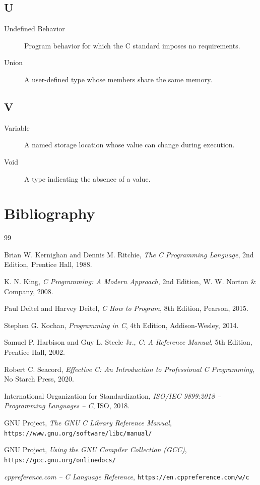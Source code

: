 \documentclass[12pt,openany]{book}
\begin{document}
\section*{U}

\begin{description}
    \item[Undefined Behavior] Program behavior for which the C standard imposes no requirements.
    \item[Union] A user-defined type whose members share the same memory.
\end{description}

\section*{V}

\begin{description}
    \item[Variable] A named storage location whose value can change during execution.
    \item[Void] A type indicating the absence of a value.
\end{description}
\chapter{Bibliography}

\begin{thebibliography}{99}

Brian W. Kernighan and Dennis M. Ritchie,
\textit{The C Programming Language},
2nd Edition,
Prentice Hall, 1988.

K. N. King,
\textit{C Programming: A Modern Approach},
2nd Edition,
W. W. Norton \& Company, 2008.

Paul Deitel and Harvey Deitel,
\textit{C How to Program},
8th Edition,
Pearson, 2015.

Stephen G. Kochan,
\textit{Programming in C},
4th Edition,
Addison-Wesley, 2014.

Samuel P. Harbison and Guy L. Steele Jr.,
\textit{C: A Reference Manual},
5th Edition,
Prentice Hall, 2002.

Robert C. Seacord,
\textit{Effective C: An Introduction to Professional C Programming},
No Starch Press, 2020.

International Organization for Standardization,
\textit{ISO/IEC 9899:2018 -- Programming Languages -- C},
ISO, 2018.

GNU Project,
\textit{The GNU C Library Reference Manual},
\texttt{https://www.gnu.org/software/libc/manual/}

GNU Project,
\textit{Using the GNU Compiler Collection (GCC)},
\texttt{https://gcc.gnu.org/onlinedocs/}

\textit{cppreference.com -- C Language Reference},
\texttt{https://en.cppreference.com/w/c}

\end{thebibliography}
\end{document}
